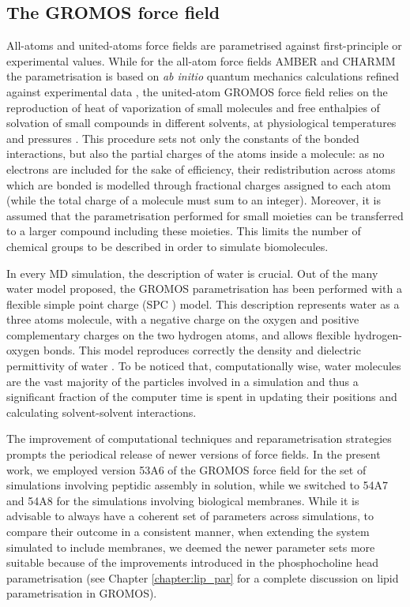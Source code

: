 \subsection{The GROMOS force field}
All-atoms and united-atoms force fields are parametrised against first-principle or experimental values.
%
While for the all-atom force fields AMBER and CHARMM the parametrisation is based on \emph{ab initio} quantum mechanics calculations refined against experimental data \citep{Maier2015,Dickson2014,Wang2004_amber,MacKerell1998,Klauda2010}, the united-atom GROMOS force field relies on the reproduction of heat of vaporization of small molecules and free enthalpies of solvation of small compounds in different solvents, at physiological temperatures and pressures \citep{Oostenbrink2005,Schmid2011,Reif2013}.
%
This procedure sets not only the constants of the bonded interactions, but also the partial charges of the atoms inside a molecule: as no electrons are included for the sake of efficiency, their redistribution across atoms which are bonded is modelled through fractional charges assigned to each atom (while the total charge of a molecule must sum to an integer).
%
Moreover, it is assumed that the parametrisation performed for small moieties can be transferred to a larger compound including these moieties. This limits the number of chemical groups to be described in order to simulate biomolecules.

In every MD simulation, the description of water is crucial. Out of the many water model proposed, the GROMOS parametrisation has been performed with a flexible simple point charge (SPC \citep{Berendsen1981}) model. This description represents water as a three atoms molecule, with a negative charge on the oxygen and positive complementary charges on the two hydrogen atoms, and allows flexible hydrogen-oxygen bonds. This model reproduces correctly the density and dielectric permittivity of water \citep{Mark2001}. To be noticed that, computationally wise, water molecules are the vast majority of the particles involved in a simulation and thus a significant fraction of the computer time is spent in updating their positions and calculating solvent-solvent interactions.

The improvement of computational techniques and reparametrisation strategies prompts the periodical release of newer versions of force fields. In the present work, we employed version 53A6 of the GROMOS force field \citep{Oostenbrink2004} for the set of simulations involving peptidic assembly in solution, while we switched to 54A7 \citep{Schmid2011} and 54A8 \citep{Reif2013} for the simulations involving biological membranes. While it is advisable to always have a coherent set of parameters across simulations, to compare their outcome in a consistent manner, when extending the system simulated to include membranes, we deemed the newer parameter sets more suitable because of the improvements introduced in the phosphocholine head parametrisation (see Chapter \ref{chapter:lip_par} for a complete discussion on lipid parametrisation in GROMOS).



